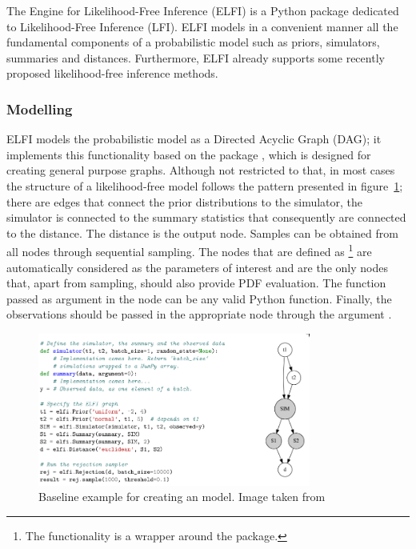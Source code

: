 The Engine for Likelihood-Free Inference (ELFI) \autocite{1708.00707}
is a Python package dedicated to Likelihood-Free Inference (LFI). ELFI
models in a convenient manner all the fundamental components of a
probabilistic model such as priors, simulators, summaries and
distances. Furthermore, ELFI already supports some recently proposed
likelihood-free inference methods.

\subsubsection{Modelling}
\label{sec:modelling}

ELFI models the probabilistic model as a Directed Acyclic Graph (DAG);
it implements this functionality based on the package
, which is designed for creating general purpose
graphs. Although not restricted to that, in most cases the structure
of a likelihood-free model follows the pattern presented in
figure~\ref{fig:elfi}; there are edges that connect the prior
distributions to the simulator, the simulator is connected to the
summary statistics that consequently are connected to the
distance. The distance is the output node. Samples can be obtained
from all nodes through sequential sampling. The nodes that are defined
as \footnote{The  functionality
  is a wrapper around the  package.} are automatically
considered as the parameters of interest and are the only nodes that,
apart from sampling, should also provide PDF evaluation. The function
passed as argument in the  node can be any valid
Python function. Finally, the observations should be passed in the
appropriate node through the argument .

\begin{figure}[!ht]
    \begin{center}
      \includegraphics[width=0.8\textwidth]{./Thesis/images/chapter2/elfi.png}
    \end{center}
    \caption[Baseline example for creating an  model]{Baseline example for creating an  model. Image taken from \cite{1708.00707}}
    \label{fig:elfi}
\end{figure}



